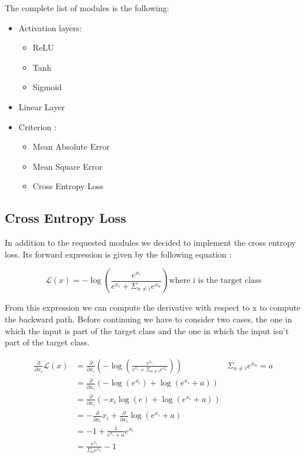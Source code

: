 \documentclass{article}
\begin{document}
The complete list of modules is the following:

\begin{itemize}
\item Activation layers:
 \begin{itemize}
	  \item ReLU
	  \item Tanh
	  \item Sigmoid
	  \end{itemize}
\item Linear Layer
\item Criterion :
 \begin{itemize}
	  \item Mean Absolute Error
	  \item Mean Square Error
	  \item Cross Entropy Loss
	  \end{itemize}
\end{itemize}

\subsection{Cross Entropy Loss}

In addition to the requested modules we decided to implement the cross entropy loss. Its forward expression is given by the following equation : 

\begin{equation}
\mathcal{L}(x) = - \log \left( \frac{e^{x_i}}{e^{x_i} + \Sigma_{n \ne i} e^{x_n}} \right) \text{where i is the target class} 
\end{equation}

From this expression we can compute the derivative with respect to x to compute the backward path. 
Before continuing we have to consider two cases, the one in which the input is part of the target class and the one in which the input isn't part of the target class.

\begin{equation}
\begin{array}{ll|l}
\frac{\partial}{\partial x_i} \mathcal{L}(x) & = \frac{\partial}{\partial x_i} \left( - \log \left( \frac{e^{x_i}}{e^{x_i} + \Sigma_{n \ne i} e^{x_n}} \right)\right) & \Sigma_{n \ne i} e^{x_n} = a\\
 & = \frac{\partial}{\partial x_i} \left( -\log(e^{x_i}) + \log(e^{x_i} + a) \right) & \\
 & = \frac{\partial}{\partial x_i} \left(-x_i\log(e) + \log(e^{x_i} + a) \right) &  \\
 & = - \frac{\partial}{\partial x_i} x_i + \frac{\partial}{\partial x_i}\log(e^{x_i} + a) & \\
 & = -1 + \frac{1}{e^{x_i} + a}e^{x_i} & \\
 & =  \frac{e^{x_i}}{\Sigma_{n} e^{x_n}} - 1 & 
\end{array}
\end{equation}
\end{document}
